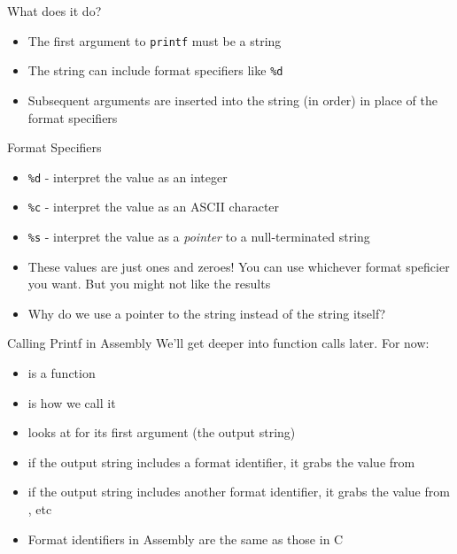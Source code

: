 \begin{frame}{What does it do?}
	\begin{itemize}
		\item The first argument to \texttt{printf} must be a string
		\item The string can include format specifiers like \texttt{\%d}
		\item Subsequent arguments are inserted into the string (in order) in place of the format specifiers
	\end{itemize}
\end{frame}

\begin{frame}{Format Specifiers}
	\begin{itemize}
		\item \texttt{\%d} - interpret the value as an integer
		\item \texttt{\%c} - interpret the value as an ASCII character
		\item \texttt{\%s} - interpret the value as a \emph{pointer} to a null-terminated string
		\item These values are just ones and zeroes! You can use whichever format speficier you want. But you might not like the results
		\item Why do we use a pointer to the string instead of the string itself?
	\end{itemize}
\end{frame}


\begin{frame}{Calling Printf in Assembly}
	We'll get deeper into function calls later. For now:
	\begin{itemize}
		\item {} is a function
		\item {} is how we call it
		\item {} looks at  for its first argument (the output string)
		\item if the output string includes a format identifier, it grabs the value from 
		\item if the output string includes another format identifier, it grabs the value from , etc
		\item Format identifiers in Assembly are the same as those in C
	\end{itemize}
\end{frame}

